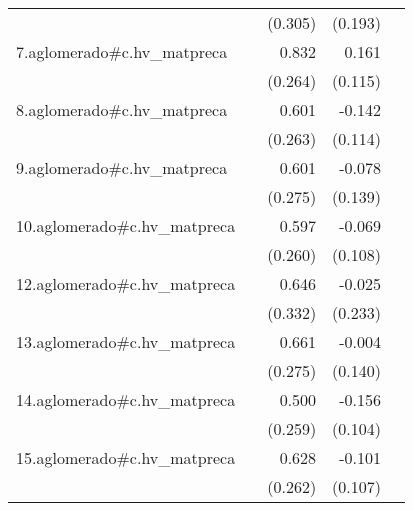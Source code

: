 {\begin{longtable}{l*{4}{D{.}{.}{-1}}}
            &                     &     (0.305)         &     (0.193)         &                     \\
\addlinespace
7.aglomerado#c.hv\_matpreca&                     &       0.832\sym{**} &       0.161         &                     \\
            &                     &     (0.264)         &     (0.115)         &                     \\
\addlinespace
8.aglomerado#c.hv\_matpreca&                     &       0.601\sym{*}  &      -0.142         &                     \\
            &                     &     (0.263)         &     (0.114)         &                     \\
\addlinespace
9.aglomerado#c.hv\_matpreca&                     &       0.601\sym{*}  &      -0.078         &                     \\
            &                     &     (0.275)         &     (0.139)         &                     \\
\addlinespace
10.aglomerado#c.hv\_matpreca&                     &       0.597\sym{*}  &      -0.069         &                     \\
            &                     &     (0.260)         &     (0.108)         &                     \\
\addlinespace
12.aglomerado#c.hv\_matpreca&                     &       0.646         &      -0.025         &                     \\
            &                     &     (0.332)         &     (0.233)         &                     \\
\addlinespace
13.aglomerado#c.hv\_matpreca&                     &       0.661\sym{*}  &      -0.004         &                     \\
            &                     &     (0.275)         &     (0.140)         &                     \\
\addlinespace
14.aglomerado#c.hv\_matpreca&                     &       0.500         &      -0.156         &                     \\
            &                     &     (0.259)         &     (0.104)         &                     \\
\addlinespace
15.aglomerado#c.hv\_matpreca&                     &       0.628\sym{*}  &      -0.101         &                     \\
            &                     &     (0.262)         &     (0.107)         &                     \\

\end{longtable}}
